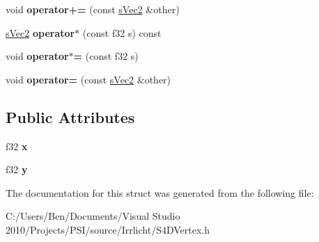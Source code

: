 \begin{DoxyCompactItemize}
\item 
\hypertarget{structirr_1_1video_1_1s_vec2_a719161cf1e32d7f513c36ba8b37f68e7}{void {\bfseries operator+=} (const \hyperlink{structirr_1_1video_1_1s_vec2}{s\-Vec2} \&other)}\label{structirr_1_1video_1_1s_vec2_a719161cf1e32d7f513c36ba8b37f68e7}

\item 
\hypertarget{structirr_1_1video_1_1s_vec2_ab4cce3e122c76359225ce7c1c6595739}{\hyperlink{structirr_1_1video_1_1s_vec2}{s\-Vec2} {\bfseries operator$\ast$} (const f32 s) const }\label{structirr_1_1video_1_1s_vec2_ab4cce3e122c76359225ce7c1c6595739}

\item 
\hypertarget{structirr_1_1video_1_1s_vec2_a1f22d535a938173268e7e705b37661ff}{void {\bfseries operator$\ast$=} (const f32 s)}\label{structirr_1_1video_1_1s_vec2_a1f22d535a938173268e7e705b37661ff}

\item 
\hypertarget{structirr_1_1video_1_1s_vec2_ac78588ca9b6e5f3354e1b211f521ad0a}{void {\bfseries operator=} (const \hyperlink{structirr_1_1video_1_1s_vec2}{s\-Vec2} \&other)}\label{structirr_1_1video_1_1s_vec2_ac78588ca9b6e5f3354e1b211f521ad0a}

\end{DoxyCompactItemize}
\subsection*{Public Attributes}
\begin{DoxyCompactItemize}
\item 
\hypertarget{structirr_1_1video_1_1s_vec2_afcb604ef7c37791514f327b0055b7980}{f32 {\bfseries x}}\label{structirr_1_1video_1_1s_vec2_afcb604ef7c37791514f327b0055b7980}

\item 
\hypertarget{structirr_1_1video_1_1s_vec2_afbc4ae1ce4b6547342061e92c28567a9}{f32 {\bfseries y}}\label{structirr_1_1video_1_1s_vec2_afbc4ae1ce4b6547342061e92c28567a9}

\end{DoxyCompactItemize}


The documentation for this struct was generated from the following file\-:\begin{DoxyCompactItemize}
\item 
C\-:/\-Users/\-Ben/\-Documents/\-Visual Studio 2010/\-Projects/\-P\-S\-I/source/\-Irrlicht/S4\-D\-Vertex.\-h\end{DoxyCompactItemize}
